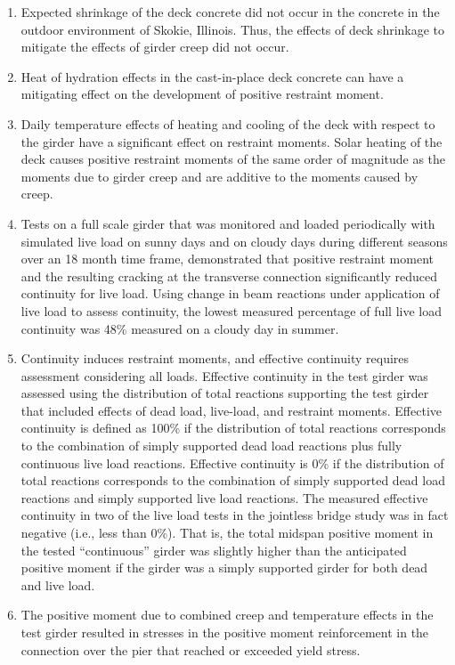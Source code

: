 \begin{enumerate}
  \item Expected shrinkage of the deck concrete did not occur in the concrete in the outdoor environment of Skokie, Illinois. Thus, the effects of deck shrinkage to mitigate the effects of girder creep did not occur.
  \item Heat of hydration effects in the cast-in-place deck concrete can have a mitigating effect on the development of positive restraint moment.
  \item Daily temperature effects of heating and cooling of the deck with respect to the girder have a significant effect on restraint moments. Solar heating of the deck causes positive restraint moments of the same order of magnitude as the moments due to girder creep and are additive to the moments caused by creep.
  \item Tests on a full scale girder that was monitored and loaded periodically with simulated live load on sunny days and on cloudy days during different seasons over an 18 month time frame, demonstrated that positive restraint moment and the resulting cracking at the transverse connection significantly reduced continuity for live load. Using change in beam reactions under application of live load to assess continuity, the lowest measured percentage of full live load continuity was 48\% measured on a cloudy
  day in summer.
  \item Continuity induces restraint moments, and effective continuity requires assessment considering all loads. Effective continuity in the test girder was assessed using the distribution of total reactions supporting the test girder that included effects of dead load, live-load, and restraint moments. Effective continuity is defined as 100\% if the distribution of total reactions corresponds to the combination of simply supported dead load reactions plus fully continuous live load reactions. Effective continuity is 0\% if the distribution of total reactions corresponds to the combination of simply supported dead load reactions and simply supported live load reactions. The measured effective continuity in two of the live load tests in the jointless bridge study was in fact negative (i.e., less than 0\%). That is, the total midspan positive moment in the tested “continuous” girder was slightly higher than the anticipated positive moment if the girder was a simply supported girder for both dead and live load.
  \item The positive moment due to combined creep and temperature effects in the test girder resulted in stresses in the positive moment reinforcement in the connection over the pier that reached or exceeded yield stress.
\end{enumerate}


